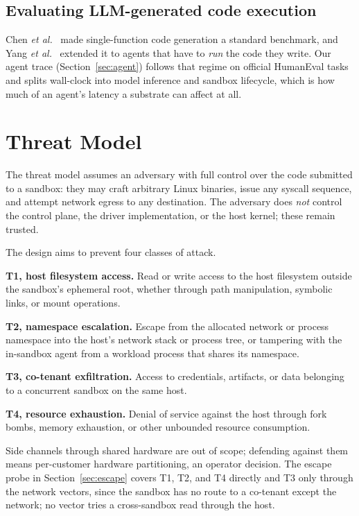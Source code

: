 \documentclass[conference]{IEEEtran}
\begin{document}
\subsection{Evaluating LLM-generated code execution}
Chen \emph{et al.}~\cite{humaneval} made single-function code generation a
standard benchmark, and Yang \emph{et al.}~\cite{sweagent} extended it to
agents that have to \emph{run} the code they write. Our agent trace
(Section~\ref{sec:agent}) follows that regime on official HumanEval tasks
and splits wall-clock into model inference and sandbox lifecycle, which is
how much of an agent's latency a substrate can affect at all.



\section{Threat Model}\label{sec:threat}

The threat model assumes an adversary with full control over the code
submitted to a sandbox: they may craft arbitrary Linux binaries, issue any
syscall sequence, and attempt network egress to any destination. The adversary
does \emph{not} control the control plane, the driver implementation, or the
host kernel; these remain trusted.

The design aims to prevent four classes of attack.

\textbf{T1, host filesystem access.} Read or write access to the host
filesystem outside the sandbox's ephemeral root, whether through path
manipulation, symbolic links, or mount operations.

\textbf{T2, namespace escalation.} Escape from the allocated network or
process namespace into the host's network stack or process tree, or
tampering with the in-sandbox agent from a workload process that shares its
namespace.

\textbf{T3, co-tenant exfiltration.} Access to credentials, artifacts, or
data belonging to a concurrent sandbox on the same host.

\textbf{T4, resource exhaustion.} Denial of service against the host through
fork bombs, memory exhaustion, or other unbounded resource consumption.

Side channels through shared hardware are out of scope; defending against
them means per-customer hardware partitioning, an operator decision. The
escape probe in Section~\ref{sec:escape} covers T1, T2, and T4 directly and
T3 only through the network vectors, since the sandbox has no route to a
co-tenant except the network; no vector tries a cross-sandbox read through
the host.
\end{document}
